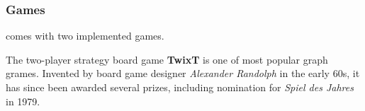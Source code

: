 \subsubsection{Games}
{\graphioli} comes with two implemented games.\par
The two-player strategy board game \textbf{TwixT} is one of most popular graph grames. Invented by board game designer \emph{Alexander Randolph} in the early 60s, it has since been awarded several prizes, including nomination for \emph{Spiel des Jahres} in 1979.\par
{}
\par